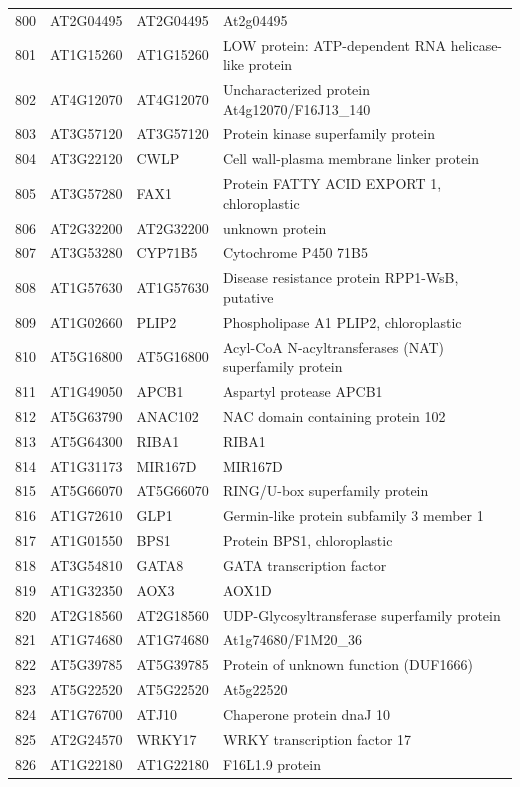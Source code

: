 \documentclass[11pt]{article}
\begin{document}
\begin{center}
\begin{tabular}{rlll}
800 & AT2G04495 & AT2G04495 & At2g04495\\
801 & AT1G15260 & AT1G15260 & LOW protein: ATP-dependent RNA helicase-like protein\\
802 & AT4G12070 & AT4G12070 & Uncharacterized protein At4g12070/F16J13\_140\\
803 & AT3G57120 & AT3G57120 & Protein kinase superfamily protein\\
804 & AT3G22120 & CWLP & Cell wall-plasma membrane linker protein\\
805 & AT3G57280 & FAX1 & Protein FATTY ACID EXPORT 1, chloroplastic\\
806 & AT2G32200 & AT2G32200 & unknown protein\\
807 & AT3G53280 & CYP71B5 & Cytochrome P450 71B5\\
808 & AT1G57630 & AT1G57630 & Disease resistance protein RPP1-WsB, putative\\
809 & AT1G02660 & PLIP2 & Phospholipase A1 PLIP2, chloroplastic\\
810 & AT5G16800 & AT5G16800 & Acyl-CoA N-acyltransferases (NAT) superfamily protein\\
811 & AT1G49050 & APCB1 & Aspartyl protease APCB1\\
812 & AT5G63790 & ANAC102 & NAC domain containing protein 102\\
813 & AT5G64300 & RIBA1 & RIBA1\\
814 & AT1G31173 & MIR167D & MIR167D\\
815 & AT5G66070 & AT5G66070 & RING/U-box superfamily protein\\
816 & AT1G72610 & GLP1 & Germin-like protein subfamily 3 member 1\\
817 & AT1G01550 & BPS1 & Protein BPS1, chloroplastic\\
818 & AT3G54810 & GATA8 & GATA transcription factor\\
819 & AT1G32350 & AOX3 & AOX1D\\
820 & AT2G18560 & AT2G18560 & UDP-Glycosyltransferase superfamily protein\\
821 & AT1G74680 & AT1G74680 & At1g74680/F1M20\_36\\
822 & AT5G39785 & AT5G39785 & Protein of unknown function (DUF1666)\\
823 & AT5G22520 & AT5G22520 & At5g22520\\
824 & AT1G76700 & ATJ10 & Chaperone protein dnaJ 10\\
825 & AT2G24570 & WRKY17 & WRKY transcription factor 17\\
826 & AT1G22180 & AT1G22180 & F16L1.9 protein\\

\end{tabular}
\end{center}
\end{document}
